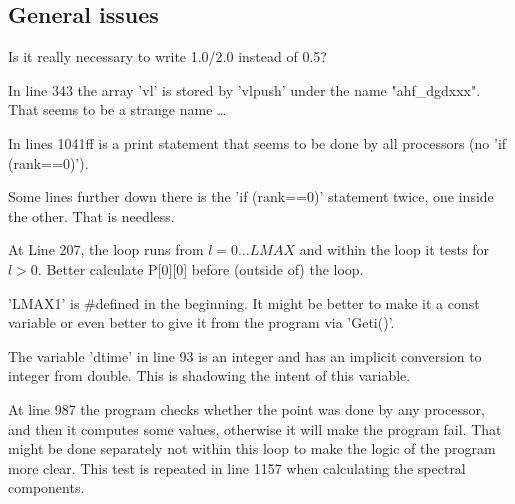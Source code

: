 \documentclass[11pt,a4paper,twoside]{article}
\begin{document}
%
%
\newpage 
\subsection{General issues}
Is it really necessary to write 1.0/2.0 instead of 0.5?

In line 343 the array 'vl' is stored by 'vlpush' under 
the name "ahf\_dgdxxx". That seems to be a strange name \dots

In lines 1041ff is a print statement that seems to be done
by all processors (no 'if (rank==0)'). 

Some lines further down there is the 'if (rank==0)' statement twice,
one inside the other. That is needless.

At Line 207, the loop runs from $ l= 0\dots  LMAX$ and within the loop
it tests for $l>0$. Better calculate P[0][0] before (outside of) the loop.


'LMAX1' is \#defined in the beginning. It might be better to make
it a const variable or even better to give it from the program via 'Geti()'.

The variable 'dtime' in line 93 is an integer and has an 
implicit conversion to integer from double. This is shadowing the intent
of this variable.


At line 987 the program checks whether the point was done
by any processor, and then it computes some values, otherwise it will 
make the program fail. That might be done separately not within this loop
to make the logic of the program more clear. This test is
repeated in line 1157 when calculating the spectral components.
\end{document}
